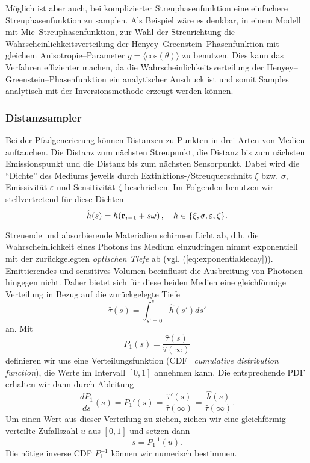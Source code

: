 	Möglich ist aber auch, bei komplizierter Streuphasenfunktion eine einfachere Streuphasenfunktion zu samplen. Als Beispiel wäre es denkbar, in einem Modell mit Mie--Streuphasenfunktion, zur Wahl der Streurichtung die Wahrscheinlichkeitsverteilung der Henyey--Greenstein--Phasenfunktion mit gleichem Anisotropie--Parameter $g=\langle \text{cos}(\theta)\rangle$ zu benutzen. Dies kann das Verfahren effizienter machen, da die Wahrscheinlichkeitsverteilung der Henyey--Greenstein--Phasenfunktion ein analytischer Ausdruck ist und somit Samples analytisch mit der Inversionsmethode erzeugt werden können.
	
	\subsubsection{Distanzsampler}\label{subsubsec:distancesampler}
	Bei der Pfadgenerierung können Distanzen zu Punkten in drei Arten von Medien auftauchen. Die Distanz zum nächsten Streupunkt, die Distanz bis zum nächsten Emissionspunkt und die Distanz bis zum nächsten Sensorpunkt. Dabei wird die ``Dichte'' des Mediums jeweils durch Extinktions-/Streuquerschnitt $\xi$ bzw. $\sigma$, Emissivität $\varepsilon$ und Sensitivität $\zeta$ beschrieben. Im Folgenden benutzen wir stellvertretend für diese Dichten
	$${\hat h}(s)=h(\mathbf{r}_{i-1}+s\omega)\,,\quad h\in\{\xi,\sigma,\varepsilon,\zeta\}.$$
	
	Streuende und absorbierende Materialien schirmen Licht ab, d.h. die Wahrscheinlichkeit eines Photons ins Medium einzudringen nimmt exponentiell mit der zurückgelegten {\em optischen Tiefe} ab (vgl. (\ref{eq:exponentialdecay})). Emittierendes und sensitives Volumen beeinflusst die Ausbreitung von Photonen hingegen nicht. Daher bietet sich für diese beiden Medien eine gleichförmige Verteilung in Bezug auf die zurückgelegte Tiefe
	$${\hat \tau}(s)=\int_{s'=0}^s {\hat h}(s')ds'$$
	an. Mit
	$$P_1(s)=\frac{{\hat \tau}(s)}{{\hat \tau}(\infty)}$$
	definieren wir uns eine Verteilungsfunktion (CDF={\em cumulative distribution function}), die Werte im Intervall $[0,1]$ annehmen kann. Die entsprechende PDF erhalten wir dann durch Ableitung
	$$\frac{dP_1}{ds}(s)=P_1'(s)=\frac{{\hat \tau}'(s)}{{\hat \tau}(\infty)}=\frac{{\hat h}(s)}{{\hat \tau}(\infty)}.$$
	Um einen Wert aus dieser Verteilung zu ziehen, ziehen wir eine gleichförmig verteilte Zufallszahl $u$ aus $[0,1]$ und setzen dann
	$$s=P_1^{-1}(u).$$
	Die nötige inverse CDF $P_1^{-1}$ können wir numerisch bestimmen.
	
